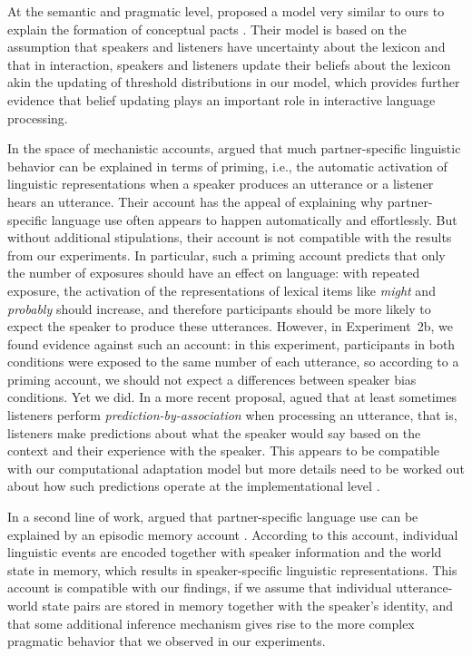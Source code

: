 \documentclass[man, floatsintext]{apa6}
\begin{document}
At the semantic and pragmatic level, \textcite{Hawkins2017} proposed a model 
very similar to ours to explain the formation of conceptual pacts \parencite{Clark1986}. 
Their model is based on the assumption that speakers and listeners have uncertainty 
about the lexicon \parencite[see also][]{Bergen2016} and that in interaction, speakers 
and listeners update their beliefs about the lexicon akin the updating of threshold distributions 
in our model, which provides further evidence that belief updating plays an important role in interactive language processing.

In the space of mechanistic accounts, \textcite{Pickering2004} argued that much partner-specific linguistic behavior
 can be explained in terms of priming, i.e., the automatic activation of linguistic representations when 
a speaker produces an utterance or a listener hears an utterance. Their account has the appeal
of explaining why partner-specific language use often appears to happen automatically and effortlessly. But
without additional stipulations, their account is not compatible with the results from our 
experiments. In particular, such a priming account predicts that only the number of exposures should have
an effect on language: with repeated exposure, the activation of the 
representations of lexical items like \textit{might} and \textit{probably} should increase, 
and therefore participants should be more likely to expect the speaker to produce these utterances.
However, in Experiment~2b, we found evidence against such an account: in this experiment,
participants in both conditions were exposed to the same number of each utterance, so according to
a priming account, we should not expect a differences between speaker bias conditions. Yet we did. In a more recent proposal, \textcite{Pickering2013} agued that
at least sometimes listeners perform \textit{prediction-by-association} when processing
an utterance, that is, listeners make predictions about what the speaker would say based on
the context and their experience with the speaker.  This appears to
be compatible with our computational adaptation model but more details need to be
worked out about how such predictions operate at the implementational level \parencite{Marr1982}.

In a second line of work, \textcite{Horton2005,Horton2016} argued that partner-specific
language use can be explained by an episodic memory account \parencite{Goldinger1998,Johnson1997,Pierrehumbert2001}.
According to this account, individual linguistic events are encoded together with
speaker information and the world state in memory, which results in speaker-specific
linguistic representations. This account is compatible with our findings, if we assume
that individual utterance-world state pairs are stored in memory together with the speaker's 
identity, and that some additional inference mechanism gives rise to the more complex
pragmatic behavior that we observed in our experiments.
\end{document}
